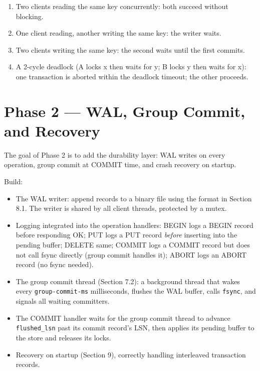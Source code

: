 \documentclass[11pt,a4paper]{article}
\begin{document}
\begin{enumerate}
\item Two clients reading the same key concurrently: both succeed without blocking.
\item One client reading, another writing the same key: the writer waits.
\item Two clients writing the same key: the second waits until the first commits.
\item A 2-cycle deadlock (A locks x then waits for y; B locks y then waits for x): one transaction is aborted within the deadlock timeout; the other proceeds.
\end{enumerate}

\section{Phase 2 --- WAL, Group Commit, and Recovery}

The goal of Phase 2 is to add the durability layer: WAL writes on every operation, group commit at COMMIT time, and crash recovery on startup.

Build:
\begin{itemize}
\item The WAL writer: append records to a binary file using the format in Section 8.1. The writer is shared by all client threads, protected by a mutex.

\item Logging integrated into the operation handlers: BEGIN logs a BEGIN record before responding OK; PUT logs a PUT record \textit{before} inserting into the pending buffer; DELETE same; COMMIT logs a COMMIT record but does not call fsync directly (group commit handles it); ABORT logs an ABORT record (no fsync needed).

\item The group commit thread (Section 7.2): a background thread that wakes every \texttt{group-commit-ms} milliseconds, flushes the WAL buffer, calls \texttt{fsync}, and signals all waiting committers.

\item The COMMIT handler waits for the group commit thread to advance \texttt{flushed\_lsn} past its commit record's LSN, then applies its pending buffer to the store and releases its locks.

\item Recovery on startup (Section 9), correctly handling interleaved transaction records.
\end{itemize}
\end{document}

